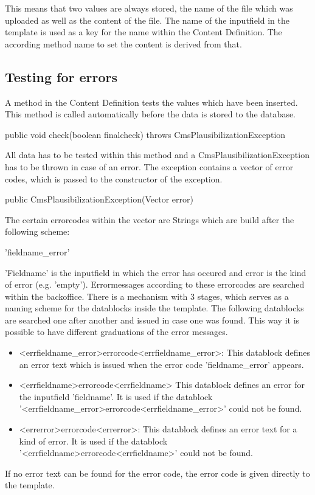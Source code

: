 This means that two values are always stored, the name of the file which was
uploaded as well as the content of the file.
The name of the inputfield in the template is used as a key for the name within 
the Content Definition. The according method name to set the content is 
derived from that.

\subsection{Testing for errors}
A method in the Content Definition tests the values which have been inserted.
This method is called automatically before the data is stored to the database.

\begin{java}
public void check(boolean finalcheck) throws CmsPlausibilizationException
\end{java}

All data has to be tested within this method and a CmsPlausibilizationException
has to be thrown in case of an error. The exception contains a vector of 
error codes, which is passed to the constructor of the exception.

\begin{java}
public CmsPlausibilizationException(Vector error)
\end{java}

The certain errorcodes within the vector are Strings which are build 
after the following scheme:

'fieldname\_error'

'Fieldname' is the inputfield in which the error has occured and error is
the kind of error (e.g. 'empty'). Errormessages according to these errorcodes
are searched within the backoffice. There is a mechanism with 3 stages, which
serves as a naming scheme for the datablocks inside the template. The following
datablocks are searched one after another and issued in case one was found.
This way it is possible to have different graduations of the error messages.

\begin{itemize}
\item <errfieldname\_error>errorcode<errfieldname\_error>: This datablock 
	defines an error text which is issued when the error code
	'fieldname\_error' appears.
\item <errfieldname>errorcode<errfieldname> This datablock defines
	an error for the inputfield 'fieldname'. It is used if the 
	datablock \\
	'<errfieldname\_error>errorcode<errfieldname\_error>' could
	not be found.
\item <errerror>errorcode<errerror>: This datablock defines an error text for
	a kind of error. It is used if the datablock 
	'<errfieldname>errorcode<errfieldname>' could not be found.
\end{itemize}

If no error text can be found for the error code, the error code is given 
directly to the template.




